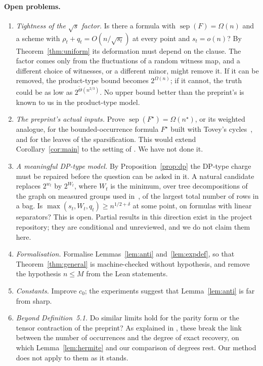 \documentclass[11pt,a4paper]{article}
\theoremstyle{definition}
\theoremstyle{remark}
\newcommand{\sep}{\operatorname{sep}}
\begin{document}
\paragraph{Open problems.}
\begin{enumerate}
\item \emph{Tightness of the $\sqrt s$ factor.} Is there a formula with
 $\sep(F)=\Omega(n)$ and a scheme with $\rho_t+q_t=O(n/\sqrt{s_t})$ at every point and
 $s_t=o(n)$? By Theorem~\ref{thm:uniform} its deformation must depend on the clause. The
 factor comes only from the fluctuations of a random witness map, and a different choice of
 witnesses, or a different minor, might remove it. If it can be removed, the product-type
 bound becomes $2^{\Omega(n)}$; if it cannot, the truth could be as low as
 $2^{\tilde\Theta(n^{2/3})}$.
 No upper bound better than the preprint's is known to us in the product-type model.
\item \emph{The preprint's actual inputs.} Prove $\sep(F^\star)=\Omega(n^\star)$, or its
 weighted analogue, for the bounded-occurrence formula $F^\star$ built with Tovey's
 cycles~\cite{Tov84}, and for the leaves of the sparsification. This would extend
 Corollary~\ref{cor:main} to the setting of \cite[Theorem~8.3]{DL}. We have not done it.
\item \emph{A meaningful DP-type model.} By Proposition~\ref{prop:dp} the DP-type charge
 must be repaired before the question can be asked in it. A natural candidate replaces
 $2^{w_t}$ by $2^{W_t}$, where $W_t$ is the minimum, over tree decompositions of the graph
 on measured groups used in~\cite{DL}, of the largest total number of rows in a bag. Is
 $\max(s_t,W_t,q_t)\ge n^{1/2+\delta}$ at some point, on formulas with linear separators?
 This is open. Partial results in this direction exist in the project repository; they are
 conditional and unreviewed, and we do not claim them here.
\item \emph{Formalisation.} Formalise Lemmas~\ref{lem:anti} and~\ref{lem:expdef}, so that
 Theorem~\ref{thm:general} is machine-checked without hypothesis, and remove the hypothesis
 $n\le M$ from the Lean statements.
\item \emph{Constants.} Improve $c_0$; the experiments suggest that
 Lemma~\ref{lem:anti} is far from sharp.
\item \emph{Beyond Definition~5.1.} Do similar limits hold for the parity form or the tensor
 contraction of the preprint? As explained in \cite[Section~5.1]{DL}, these break the link
 between the number of occurrences and the degree of exact recovery, on which
 Lemma~\ref{lem:hermite} and our comparison of degrees rest. Our method does not apply to
 them as it stands.
\end{enumerate}
\end{document}
